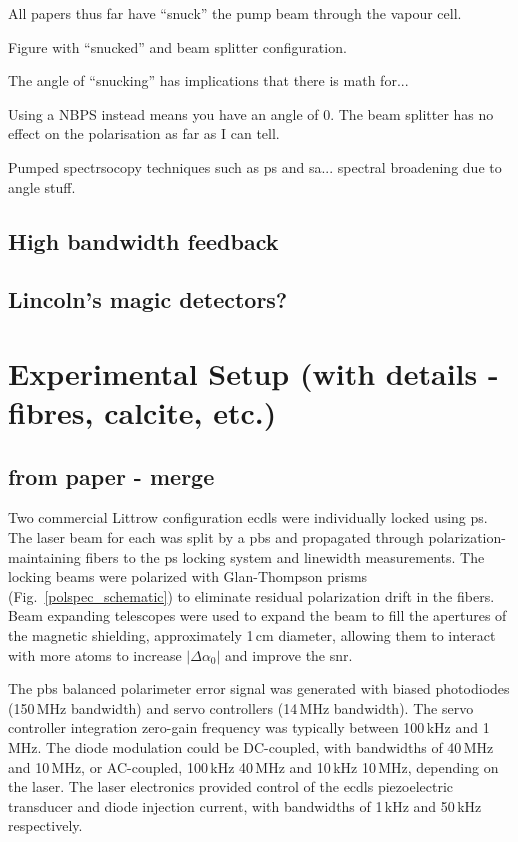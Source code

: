 All papers thus far have ``snuck'' the pump beam through the vapour cell.

Figure with ``snucked'' and beam splitter configuration.

The angle of ``snucking'' has implications that there is math for...

Using a NBPS instead means you have an angle of 0.
The beam splitter has no effect on the polarisation as far as I can tell.

Pumped spectrsocopy techniques such as \gls{ps} and \gls{sa}... spectral broadening due to angle stuff.

\subsection{High bandwidth feedback}


\subsection{Lincoln's magic detectors?}
\section{Experimental Setup (with details - fibres, calcite, etc.)}
\subsection{from paper - merge}
Two commercial Littrow configuration \glspl*{ecdl} \cite{equipment} were individually locked using \gls*{ps}.
The laser beam for each was split by a \gls*{pbs} and propagated through polarization-maintaining fibers to the \gls*{ps} locking system and linewidth measurements.
The locking beams were polarized with Glan-Thompson prisms (Fig.~\ref{polspec_schematic}) to eliminate residual polarization drift in the fibers.
Beam expanding telescopes were used to expand the beam to fill the apertures of the magnetic shielding, approximately 1\,cm diameter, allowing them to interact with more atoms to increase $|\Delta\alpha_0|$ and improve the \gls*{snr}.

The \gls*{pbs} balanced polarimeter error signal was generated with biased photodiodes (150\,MHz bandwidth) and servo controllers (14\,MHz bandwidth).
The servo controller integration zero-gain frequency was typically between 100\,kHz and 1\,MHz.
The diode modulation could be DC-coupled, with bandwidths of 40\,MHz and 10\,MHz, or AC-coupled, 100\,kHz\,\textendash\,40\,MHz and 10\,kHz\,\textendash\,10\,MHz, depending on the laser.
The laser electronics provided control of the \glspl*{ecdl} piezoelectric transducer and diode injection current, with bandwidths of 1\,kHz and 50\,kHz respectively.

